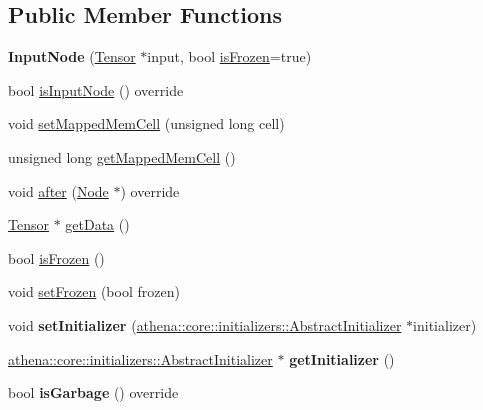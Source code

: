 \subsection*{Public Member Functions}
\begin{DoxyCompactItemize}
\item 
\mbox{\label{classathena_1_1core_1_1_input_node_a14987336678cfcbc2ddbd3f6b67bb572}} 
{\bfseries Input\+Node} (\mbox{\hyperlink{classathena_1_1core_1_1_tensor}{Tensor}} $\ast$input, bool \mbox{\hyperlink{classathena_1_1core_1_1_input_node_a4be7482bcf2e56ea3fd03a2bf79be074}{is\+Frozen}}=true)
\item 
bool \mbox{\hyperlink{classathena_1_1core_1_1_input_node_a2548b569a336b75c0005295833052979}{is\+Input\+Node}} () override
\item 
void \mbox{\hyperlink{classathena_1_1core_1_1_input_node_a8c17ce96d989454e6316c1c049c2c98d}{set\+Mapped\+Mem\+Cell}} (unsigned long cell)
\item 
unsigned long \mbox{\hyperlink{classathena_1_1core_1_1_input_node_acebc0cbf077eaae99f5c11cfba608533}{get\+Mapped\+Mem\+Cell}} ()
\item 
void \mbox{\hyperlink{classathena_1_1core_1_1_input_node_aaec12f4c76b6d9890efe1fb4337a1b61}{after}} (\mbox{\hyperlink{classathena_1_1core_1_1_node}{Node}} $\ast$) override
\item 
\mbox{\hyperlink{classathena_1_1core_1_1_tensor}{Tensor}} $\ast$ \mbox{\hyperlink{classathena_1_1core_1_1_input_node_a983588a56beeb817a59cf9b7e4a63b55}{get\+Data}} ()
\item 
bool \mbox{\hyperlink{classathena_1_1core_1_1_input_node_a4be7482bcf2e56ea3fd03a2bf79be074}{is\+Frozen}} ()
\item 
void \mbox{\hyperlink{classathena_1_1core_1_1_input_node_a45311e1bbff5dd28df3c3877aaa10109}{set\+Frozen}} (bool frozen)
\item 
\mbox{\label{classathena_1_1core_1_1_input_node_a165dadd24956ef927c4342e9d365c46d}} 
void {\bfseries set\+Initializer} (\mbox{\hyperlink{classathena_1_1core_1_1initializers_1_1_abstract_initializer}{athena\+::core\+::initializers\+::\+Abstract\+Initializer}} $\ast$initializer)
\item 
\mbox{\label{classathena_1_1core_1_1_input_node_a1032db02e6706b02b8bb72d68709402b}} 
\mbox{\hyperlink{classathena_1_1core_1_1initializers_1_1_abstract_initializer}{athena\+::core\+::initializers\+::\+Abstract\+Initializer}} $\ast$ {\bfseries get\+Initializer} ()
\item 
\mbox{\label{classathena_1_1core_1_1_input_node_a237d0f0a0d0e705485d1c45c72da0470}} 
bool {\bfseries is\+Garbage} () override
\end{DoxyCompactItemize}
